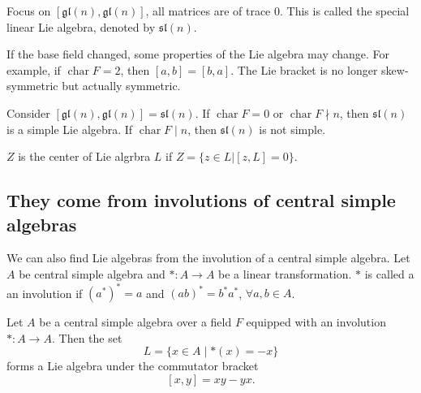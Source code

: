 \documentclass[11pt, a4paper]{report}
\begin{document}
\begin{example} 
Focus on $ [\mathfrak{gl}(n),\mathfrak{gl}(n)] $, all matrices are of trace 0. This is called the special linear Lie algebra, denoted by $ \mathfrak{sl}(n) $.
\end{example}

\begin{example}
    If the base field changed, some properties of the Lie algebra may change. For example, if $\operatorname{char}F=2$, then $[a,b]=[b,a]$. The Lie bracket is no longer skew-symmetric but actually symmetric.

    Consider $ [\mathfrak{gl}(n),\mathfrak{gl}(n)]=\mathfrak{sl}(n) $. If $\operatorname{char}F=0$ or $\operatorname{char}F \nmid n$, then $\mathfrak{sl}(n)$ is a simple Lie algebra. If $\operatorname{char}F\mid n$, then $\mathfrak{sl}(n)$ is not simple.
\end{example}

\begin{definition} 
$ Z $ is the center of Lie algrbra $ L $ if $ Z=\{ z \in L | [z,L]=0 \} $.   
\end{definition}

\subsection{They come from involutions of central simple algebras}

We can also find Lie algebras from the involution of a central simple algebra. Let $ A $ be central simple algebra and $ *: A \to A $ be a linear transformation. $ * $ is called a an involution if $ (a^*)^* =a $ and $ (ab)^*=b^*a^* $, $ \forall a,b \in A $.

\begin{proposition}
    Let $A$ be a central simple algebra over a field $F$ equipped with an involution
    $* : A \to A$. Then the set
    \[
    L=\{x\in A \mid *(x)=-x\}
    \]
    forms a Lie algebra under the commutator bracket
    \[
    [x,y]=xy-yx .
    \]
    \end{proposition}
    
\end{document}
